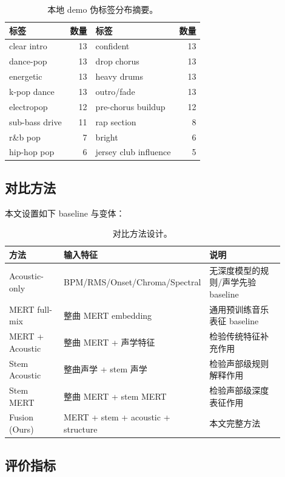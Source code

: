 \documentclass[UTF8,zihao=-4]{ctexart}
\begin{document}
\begin{table}[H]
\centering
\caption{本地 demo 伪标签分布摘要。}
\small
\begin{tabular}{lrlr}
\toprule
标签 & 数量 & 标签 & 数量 \\
\midrule
clear intro & 13 & confident & 13 \\
dance-pop & 13 & drop chorus & 13 \\
energetic & 13 & heavy drums & 13 \\
k-pop dance & 13 & outro/fade & 13 \\
electropop & 12 & pre-chorus buildup & 12 \\
sub-bass drive & 11 & rap section & 8 \\
r\&b pop & 7 & bright & 6 \\
hip-hop pop & 6 & jersey club influence & 5 \\
\bottomrule
\end{tabular}
\end{table}

\subsection{对比方法}

本文设置如下 baseline 与变体：

\begin{table}[H]
\centering
\caption{对比方法设计。}
\label{tab:baseline}
\small
\begin{tabular}{p{0.22\linewidth}p{0.34\linewidth}p{0.34\linewidth}}
\toprule
方法 & 输入特征 & 说明 \\
\midrule
Acoustic-only & BPM/RMS/Onset/Chroma/Spectral & 无深度模型的规则/声学先验 baseline \\
MERT full-mix & 整曲 MERT embedding & 通用预训练音乐表征 baseline \\
MERT + Acoustic & 整曲 MERT + 声学特征 & 检验传统特征补充作用 \\
Stem Acoustic & 整曲声学 + stem 声学 & 检验声部级规则解释作用 \\
Stem MERT & 整曲 MERT + stem MERT & 检验声部级深度表征作用 \\
Fusion (Ours) & MERT + stem + acoustic + structure & 本文完整方法 \\
\bottomrule
\end{tabular}
\end{table}

\subsection{评价指标}
\end{document}
